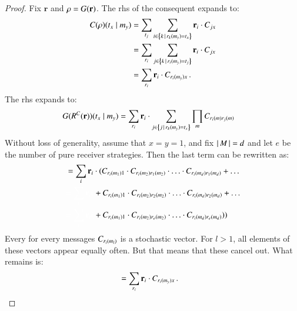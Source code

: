 \documentclass[fleqn,reqno,10pt]{article}
\renewcommand{\Rmixed}{\ensuremath{\mathrm{\mathbf{r}}}}
\begin{document}
\begin{proof}
  Fix $\Rmixed$ and $\Rstrat = G(\Rmixed)$. The rhs of the consequent
  expands to:
  \begin{align*}
    C(\Rstrat)(\state_x \probbar \messg_y) & = \sum_{\state_j}
    \sum_{i \in \set{k \setbar \Rpure_k(\messg_y) = \state_x}}
    \Rmixed_i \cdot C_{jx} \\
    & = \sum_{\Rpure_i} \sum_{j \in \set{k \setbar \Rpure_i(\messg_y) = \state_j}}
    \Rmixed_i \cdot C_{jx} \\
    & = \sum_{\Rpure_i} \Rmixed_i \cdot C_{\Rpure_i(\messg_y)x} \,.
  \end{align*}
  The rhs expands to:
  \begin{align*}
    G(R^C(\Rmixed))(\state_x \probbar \messg_y) & = \sum_{\Rpure_i}
    \Rmixed_i \cdot \sum_{j \in \set{j \setbar \Rpure_k(\messg_y) =
        \state_x}} 
    \prod_{\messg} C_{\Rpure_i(\messg)\Rpure_j(\messg)}
  \end{align*}
  Without loss of generality, assume that $x=y=1$, and fix
  $\left \lvert \, M \, \right\rvert=d$ and let $e$ be the number of pure receiver
  strategies. Then the last term can be rewritten as:
  \begin{align*}
    & = \sum_{i}
    \Rmixed_i \cdot ( C_{\Rpure_i(\messg_1)1} \cdot
      C_{\Rpure_i(\messg_2)\Rpure_1(\messg_2)} \cdot \ldots \cdot
      C_{\Rpure_i(\messg_d)\Rpure_1(\messg_d)} + \ldots  \\
      & \textcolor{white}{ = \sum_{i}
    \Rmixed_i  (}  +  C_{\Rpure_i(\messg_1)1} \cdot
      C_{\Rpure_i(\messg_2)\Rpure_2(\messg_2)} \cdot \ldots \cdot
      C_{\Rpure_i(\messg_d)\Rpure_2(\messg_d)} + \ldots  \\
      & \textcolor{white}{ = \sum_{i}
    \Rmixed_i  (}  + C_{\Rpure_i(\messg_1)1} \cdot
      C_{\Rpure_i(\messg_2)\Rpure_e(\messg_2)} \cdot \ldots \cdot
      C_{\Rpure_i(\messg_d)\Rpure_e(\messg_d)}) )
  \end{align*}
  Every for every messages $C_{r_i(m_l)}$ is a stochastic
  vector. For $l>1$, all elements of these vectors appear equally
  often. But that means that these cancel out. What remains is:
  \begin{align*}
    & = \sum_{\Rpure_i} \Rmixed_i \cdot C_{\Rpure_i(\messg_y)x} \,.
  \end{align*}
\end{proof}

\printbibliography[heading=bibintoc]
\end{document}
